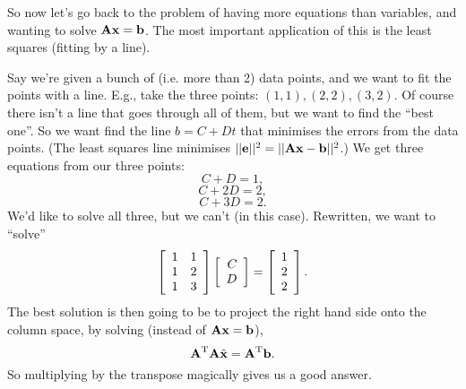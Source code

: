 So now let's go back to the problem of having more equations than variables, and wanting to solve $\boldsymbol{\mathbf{A}}\boldsymbol{\mathbf{x}} = \boldsymbol{\mathbf{b}}$. The most important application of this is the least squares (fitting by a line). 

Say we're given a bunch of (i.e. more than 2) data points, and we want to fit the points with a line. E.g., take the three points: $(1,1), (2,2), (3,2)$. Of course there isn't a line that goes through all of them, but we want to find the ``best one''. So we want find the line $b = C+Dt$ that minimises the errors from the data points. (The least squares line minimises $||\boldsymbol{\mathbf{e}}||^2 = ||\boldsymbol{\mathbf{A}}\boldsymbol{\mathbf{x}} - \boldsymbol{\mathbf{b}}||^2$.) We get three equations from our three points:
\[ C+D = 1, \]
\[ C+2D = 2, \]
\[ C+3D = 2. \]
We'd like to solve all three, but we can't (in this case). Rewritten, we want to ``solve''
\[ \left[ \begin{array}{rrrrrrrrrrrrrrrrrrrrrrrrr} 1&1\\1&2\\1&3\\ \end{array} \right]\left[ \begin{array}{rrrrrrrrrrrrrrrrrrrrrrrrr} C\\D\\ \end{array} \right] = \left[ \begin{array}{rrrrrrrrrrrrrrrrrrrrrrrrr} 1\\2\\2\\ \end{array} \right]. \] 
The best solution is then going to be to project the right hand side onto the column space, by solving (instead of $\boldsymbol{\mathbf{A}}\boldsymbol{\mathbf{x}} = \boldsymbol{\mathbf{b}}$),
\[ \boldsymbol{\mathbf{A}}^\mathrm{T}\boldsymbol{\mathbf{A}}\hat{\boldsymbol{\mathbf{x}}} = \boldsymbol{\mathbf{A}}^\mathrm{T} \boldsymbol{\mathbf{b}}. \]
So multiplying by the transpose magically gives us a good answer. 